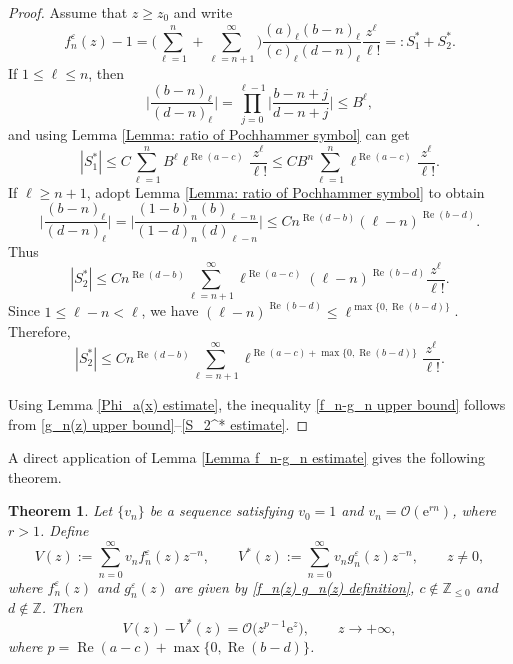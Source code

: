 \documentclass[10pt,a4paper]{amsart}
\numberwithin{equation}{section}
\newtheorem{Theorem}{Theorem}[section]
\newcommand{\ZZ}{\ensuremath{\mathbb{Z}}}
\newcommand{\me}{\mathrm{e}}
\newcommand{\mo}{\mathcal{O}}
\begin{document}
\begin{proof}
	Assume that $z\geqslant z_0$ and write
	\[f_n^{\varepsilon}(z)-1=\Biggl(\sum_{\ell=1}^{n}+\sum_{\ell=n+1}^{\infty}\Biggr)\frac{(a)_\ell(b-n)_\ell}{(c)_\ell(d-n)_\ell}\frac{z^\ell}{\ell!}=:S_1^*+S_2^*.\]
	If $1\leqslant \ell\leqslant n$, then
	\[\biggl|\frac{(b-n)_\ell}{(d-n)_\ell}\biggr|=\prod_{j=0}^{\ell-1}\biggl|\frac{b-n+j}{d-n+j}\biggr|\leqslant B^{\ell},\]
	and using Lemma \ref{Lemma: ratio of Pochhammer symbol} can get
	\begin{equation}\label{S_1^* estimate}
		|S_1^*|\leqslant C\sum_{\ell=1}^{n}B^{\ell}\ell^{\operatorname{Re}(a-c)}\frac{z^\ell}{\ell!}\leqslant CB^n\sum_{\ell=1}^{n}\ell^{\operatorname{Re}(a-c)}\frac{z^\ell}{\ell!}.
	\end{equation}
	If $\ell\geqslant n+1$, adopt Lemma \ref{Lemma: ratio of Pochhammer symbol} to obtain
	\[\biggl|\frac{(b-n)_\ell}{(d-n)_\ell}\biggr|=\biggl|\frac{(1-b)_n(b)_{\ell-n}}{(1-d)_n(d)_{\ell-n}}\biggr|\leqslant Cn^{\operatorname{Re}(d-b)}(\ell-n)^{\operatorname{Re}(b-d)}.\]
	Thus
	\[|S_2^*|\leqslant Cn^{\operatorname{Re}(d-b)}\sum_{\ell=n+1}^{\infty}\ell^{\operatorname{Re}(a-c)}(\ell-n)^{\operatorname{Re}(b-d)}\frac{z^\ell}{\ell!}.\]
	Since $1\leqslant \ell-n<\ell$, we have $(\ell-n)^{\operatorname{Re}(b-d)}\leqslant \ell^{\max\{0,\operatorname{Re}(b-d)\}}$. Therefore,
	\begin{equation}\label{S_2^* estimate}
		|S_2^*|\leqslant Cn^{\operatorname{Re}(d-b)}\sum_{\ell=n+1}^{\infty}\ell^{\operatorname{Re}(a-c)+\max\{0,\operatorname{Re}(b-d)\}}\frac{z^\ell}{\ell!}.
	\end{equation}
	
	Using Lemma \ref{Phi_a(x) estimate}, the inequality \eqref{f_n-g_n upper bound} follows from \eqref{g_n(z) upper bound}--\eqref{S_2^* estimate}.
\end{proof}

A direct application of Lemma \ref{Lemma f_n-g_n estimate} gives the following theorem.

\begin{Theorem}\label{Theorem V(z)-V^*(z) estimate}
	Let $\{v_n\}$ be a sequence satisfying $v_0=1$ and $v_n=\mo(\me^{rn})$, where $r>1$. Define
	\[V(z):=\sum_{n=0}^{\infty}v_n f_n^{\varepsilon}(z)z^{-n},\qquad V^*(z):=\sum_{n=0}^{\infty}v_n g_n^{\varepsilon}(z)z^{-n},\qquad z\ne 0,\]
	where $f_n^{\varepsilon}(z)$ and $g_n^{\varepsilon}(z)$ are given by \eqref{f_n(z) g_n(z) definition}, $c\notin\ZZ_{\leqslant 0}$ and $d\notin\ZZ$. Then
	\[V(z)-V^*(z)=\mo\big(z^{p-1}\me^z\big),\qquad z\to +\infty,\]
	where $p=\operatorname{Re}(a-c)+\max\{0,\operatorname{Re}(b-d)\}$.
\end{Theorem}
\end{document}
